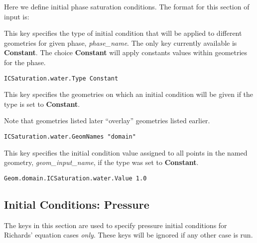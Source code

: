 Here we define initial phase saturation conditions.
The format for this section of input is:

{
This key specifies the type of initial condition that will be applied
to different geometries for given phase, {\em phase\_name}.  The only
key currently available is {\bf Constant}.  The choice {\bf Constant}
will apply constants values within geometries for the phase.
}
\begin{display}\begin{verbatim}
ICSaturation.water.Type Constant
\end{verbatim}\end{display}

{
This key specifies the geometries on which an initial condition will be
given if the type is set to {\bf Constant}.

Note that geometries listed later ``overlay'' geometries listed earlier.
}
\begin{display}\begin{verbatim}
ICSaturation.water.GeomNames "domain"
\end{verbatim}\end{display}

{
This key specifies the initial condition value assigned to all points in
the named geometry, {\em geom\_input\_name}, if the type was set to
{\bf Constant}.
}
\begin{display}\begin{verbatim}
Geom.domain.ICSaturation.water.Value 1.0
\end{verbatim}\end{display}


\subsection{Initial Conditions: Pressure}
\label{Initial Conditions: Pressure}

The keys in this section are used to specify pressure initial conditions for
Richards' equation cases {\em only}.  These keys will be ignored if any other
case is run.

